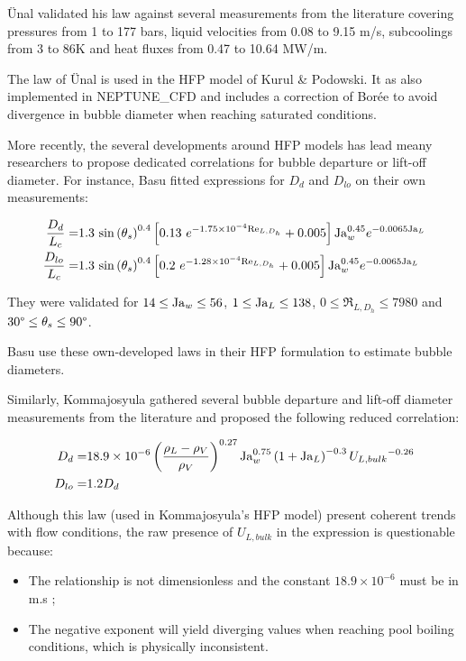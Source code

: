 \"Unal validated his law against several measurements from the literature covering pressures from 1 to 177 bars, liquid velocities from 0.08 to 9.15 m/s, subcoolings from 3 to 86K and heat fluxes from 0.47 to 10.64 MW/m.


\begin{remark*}{}
The law of \"Unal is used in the HFP model of Kurul \& Podowski. It as also implemented in NEPTUNE\_CFD and includes a correction of Borée \etal to avoid divergence in bubble diameter when reaching saturated conditions.
\end{remark*}

\npar

More recently, the several developments around HFP models has lead meany researchers to propose dedicated correlations for bubble departure or lift-off diameter. For instance, Basu \etal fitted expressions for $D_{d}$ and $D_{lo}$ on their own measurements:

\begin{align}
\frac{D_{d}}{L_{c}} =& 1.3~\sin{\theta_{s}}^{0.4}\crocht{ 0.13\ e^{-1.75\times 10^{-4} \Re_{L,D_{h}}}+0.005 }\Ja_{w}^{0.45}e^{-0.0065\Ja_{L}}\\
%
\frac{D_{lo}}{L_{c}} =& 1.3~ \sin{\theta_{s}}^{0.4}\crocht{ 0.2\ e^{-1.28\times 10^{-4} \Re_{L,D_{h}}}+0.005 }\Ja_{w}^{0.45}e^{-0.0065\Ja_{L}}
\end{align}

They were validated for $14 \leq \mathrm{Ja}_{w} \leq 56$, $1 \leq \mathrm{Ja}_{L} \leq 138$, $0\leq \Re_{L,D_{h}} \leq 7980$ and $30\degree \leq \theta_{s} \leq 90 \degree$.


\begin{remark*}{}
Basu \etal use these own-developed laws in their HFP formulation to estimate bubble diameters.
\end{remark*}

\npar

Similarly, Kommajosyula gathered several bubble departure and lift-off diameter measurements from the literature and proposed the following reduced correlation:

\begin{align}
D_{d} =& 18.9 \times 10^{-6} \left( \frac{\rho_{L}-\rho_{V}}{\rho_{V}} \right)^{0.27} \mathrm{Ja}_{w}^{0.75} \left( 1+\mathrm{Ja}_{L} \right)^{-0.3} {U_{L,bulk}}^{-0.26}\\
D_{lo} =& 1.2 D_{d}
\end{align}

\begin{remark*}{}
Although this law (used in Kommajosyula's HFP model) present coherent trends with flow conditions, the raw presence of $U_{L,bulk}$ in the expression is questionable because:

\begin{itemize}
\item The relationship is not dimensionless and the constant $18.9 \times 10^{-6}$ must be in m.s ;
\item The negative exponent will yield diverging values when reaching pool boiling conditions, which is physically inconsistent.
\end{itemize}
\end{remark*}

